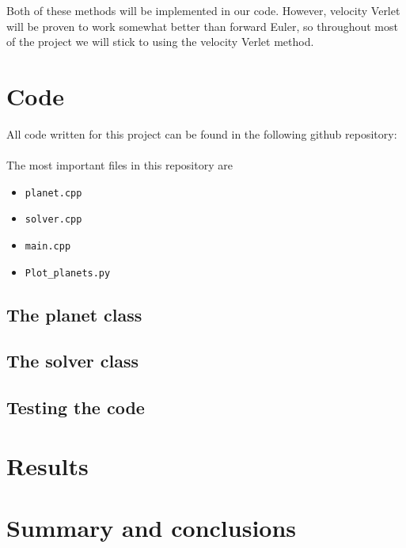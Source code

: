 \documentclass[12pt, a4paper]{article}
\begin{document}
Both of these methods will be implemented in our code. However, velocity Verlet will be 
proven to work somewhat better than forward Euler, so throughout most of the project we 
will stick to using the velocity Verlet method. 

\section{Code}

All code written for this project can be found in the following github repository: \vspace{0.5cm} \\ 
 \vspace{0.5cm} \\ 
The most important files in this repository are 
\begin{itemize}
\item \texttt{planet.cpp}
\item \texttt{solver.cpp}
\item \texttt{main.cpp}
\item \texttt{Plot\_planets.py}
\end{itemize}

\subsection{The planet class}

\subsection{The solver class}

\subsection{Testing the code}

\section{Results}

\section{Summary and conclusions}
\end{document}
